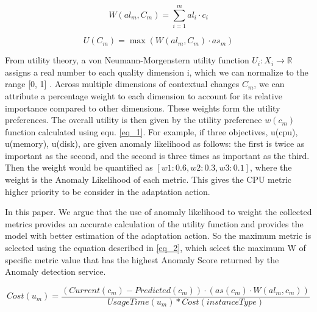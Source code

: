 \documentclass[graybox]{svmult}
\begin{document}
 
\begin{equation}
\label{eq_1}
W(al_{m},C_{m}) =  \sum_{i=1}^{m} al_{i} \cdot  c_{i}
\end{equation}

 \begin{equation}
\label{eq_2}
U(C_{m}) =  \max  (W(al_{m},C_{m}) \cdot  as_{m})
\end{equation}

 
 
 
From utility theory, a von Neumann-Morgenstern utility function $U_{i} : X_{i} \rightarrow \mathbb{R}$ assigns a real number to each quality dimension i, which we can normalize to the range [0, 1] \cite{fishburn1979two}. Across multiple dimensions of contextual changes $C_{m}$, we can attribute a percentage weight to each dimension to account for its relative importance compared to other dimensions. These weights form the utility preferences. The overall utility is then given by the utility preference $w(c_{m})$ function calculated using equ. \ref{eq_1}. For example, if three objectives, u(cpu), u(memory), u(disk), are given anomaly likelihood as follows: the first is twice as important as the second, and the second is three times as important as the third. Then the weight would be quantified as $[w1 : 0.6, w2 : 0.3, w3 : 0.1]$, where the weight is the Anomaly Likelihood of each metric. This gives the CPU metric higher priority to be consider in the adaptation action.
 

In this paper. We argue that the use of anomaly likelihood to weight the collected metrics provides an accurate calculation of the utility function and provides the model with better estimation of the adaptation action. So the maximum metric is selected using the equation described in \ref{eq_2}, which select the maximum W of specific metric value that has the highest Anomaly Score returned by the Anomaly detection service. 

\begin{equation}
\label{eq_3}
Cost(u_{m}) = \frac{(Current(c_{m}) - Predicted(c_{m}))\cdot (as(c_{m}) \cdot W(al_{m}, c_{m}))}{UsageTime(u_{m}) * Cost(instanceType)}
\end{equation}
\end{document}
